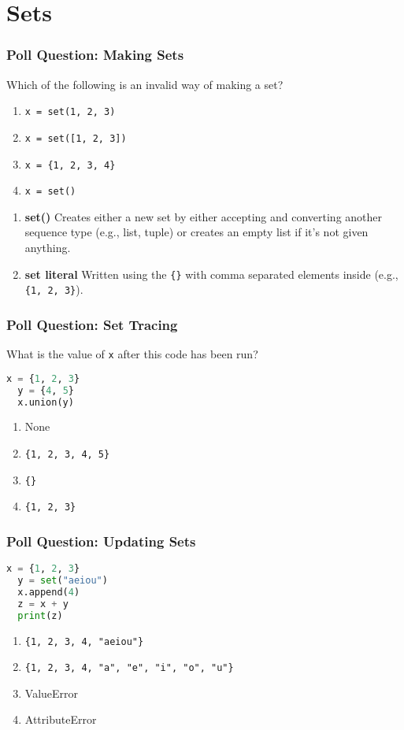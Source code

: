 \documentclass[xcolor=table]{beamer}
\begin{document}
\section{Sets}

%
%
\begin{frame}[fragile]
  \frametitle{Poll Question: Making Sets}
  Which of the following is an invalid way of making a set?
  \begin{enumerate}[A] 
    \item \lstinline|x = set(1, 2, 3)| 
    \item \lstinline|x = set([1, 2, 3])| 
    \item \lstinline|x = {1, 2, 3, 4}| 
    \item \lstinline|x = set()|
  \end{enumerate}
  \pause
  \vfill
  \vfill
  \begin{enumerate}
    \item \textbf{set()} \textrightarrow Creates either a new set by either accepting and converting another sequence type (e.g., list, tuple) or creates an empty list if it's not given anything.
    \item \textbf{set literal} \textrightarrow Written using the \lstinline|{}| with comma separated elements inside (e.g., \lstinline|{1, 2, 3}|).
  \end{enumerate}
\end{frame}

%
%
\begin{frame}[fragile]
  \frametitle{Poll Question: Set Tracing}
  What is the value of \lstinline|x| after this code has been run?
  \begin{lstlisting}[language=Python, autogobble]
  x = {1, 2, 3}
  y = {4, 5}
  x.union(y)
  \end{lstlisting}
  \vfill
  \begin{enumerate}[A] 
    \item None
    \item \lstinline|{1, 2, 3, 4, 5}|
    \item \lstinline|{}|
    \item \lstinline|{1, 2, 3}|
  \end{enumerate}
\end{frame}


%
%
\begin{frame}[fragile]
  \frametitle{Poll Question: Updating Sets}
  \begin{lstlisting}[language=Python, autogobble]
  x = {1, 2, 3}
  y = set("aeiou")
  x.append(4)
  z = x + y
  print(z)
  \end{lstlisting}
  \vfill
  \begin{enumerate}[A] 
    \item \lstinline|{1, 2, 3, 4, "aeiou"}|
    \item \lstinline|{1, 2, 3, 4, "a", "e", "i", "o", "u"}|
    \item ValueError
    \item AttributeError
  \end{enumerate}
\end{frame}
\end{document}
